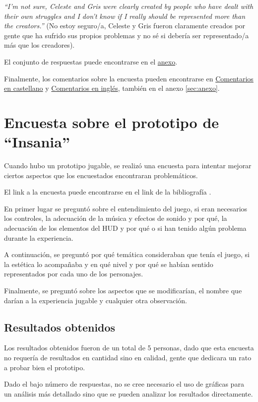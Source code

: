\documentclass[12pt, a4paper,twoside,titlepage]{book}
\begin{document}
\textit{``I'm not sure, Celeste and Gris were clearly created by people who have dealt with their own struggles and I don't know if I really should be represented more than the creators.''} (No estoy seguro/a, Celeste y Gris fueron claramente creados por gente que ha sufrido sus propios problemas y no sé si debería ser representado/a más que los creadores). 

El conjunto de respuestas puede encontrarse en el \hyperref[representacionIngles]{anexo}.

Finalmente, los comentarios sobre la encuesta pueden encontrarse en \hyperref[comentariosCastellano]{Comentarios en castellano} y \hyperref[comentariosIngles]{Comentarios en inglés}, también en el anexo \ref{sec:anexo}. 




\section{Encuesta sobre el prototipo de ``Insania''}
\label{sec:encuestaDemo}
Cuando hubo un prototipo jugable, se realizó una encuesta para intentar mejorar ciertos aspectos que los encuestados encontraran problemáticos. 

El link a la encuesta puede encontrarse en el link de la bibliografía . 

En primer lugar se preguntó sobre el entendimiento del juego, si eran necesarios los controles, la adecuación de la música y efectos de sonido y por qué, la adecuación de los elementos del HUD y por qué o si han tenido algún problema durante la experiencia. 

A continuación, se preguntó por qué temática consideraban que tenía el juego, si la estética lo acompañaba y en qué nivel y por qué se habían sentido representados por cada uno de los personajes. 

Finalmente, se preguntó sobre los aspectos que se modificarían, el nombre que darían a la experiencia jugable y cualquier otra observación. 


\subsection{Resultados obtenidos}

Los resultados obtenidos fueron de un total de 5 personas, dado que esta encuesta no requería de resultados en cantidad sino en calidad, gente que dedicara un rato a probar bien el prototipo. 

Dado el bajo número de respuestas, no se cree necesario el uso de gráficas para un análisis más detallado sino que se pueden analizar los resultados directamente. 
\end{document}

